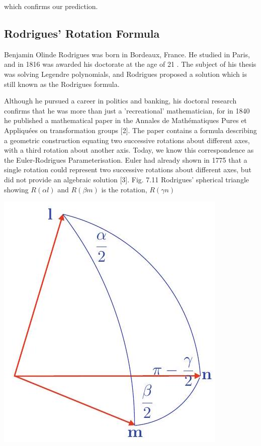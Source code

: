 \documentclass[10pt]{article}
\begin{document}
which confirms our prediction.

\subsection{Rodrigues' Rotation Formula}
Benjamin Olinde Rodrigues was born in Bordeaux, France. He studied in Paris, and in 1816 was awarded his doctorate at the age of 21 . The subject of his thesis was solving Legendre polynomials, and Rodrigues proposed a solution which is still known as the Rodrigues formula.

Although he pursued a career in politics and banking, his doctoral research confirms that he was more than just a 'recreational' mathematician, for in 1840 he published a mathematical paper in the Annales de Mathématiques Pures et Appliquées on transformation groups [2]. The paper contains a formula describing a geometric construction equating two successive rotations about different axes, with a third rotation about another axis. Today, we know this correspondence as the Euler-Rodrigues Parameterisation. Euler had already shown in 1775 that a single rotation could represent two successive rotations about different axes, but did not provide an algebraic solution [3]. Fig. 7.11 Rodrigues' spherical triangle showing $R(\alpha l)$ and $R(\beta m)$ is the rotation, $R(\gamma n)$

\begin{center}
\includegraphics[max width=\textwidth]{2023_04_20_41f1ceac5a31dc7d1b59g-127}
\end{center}
\end{document}
